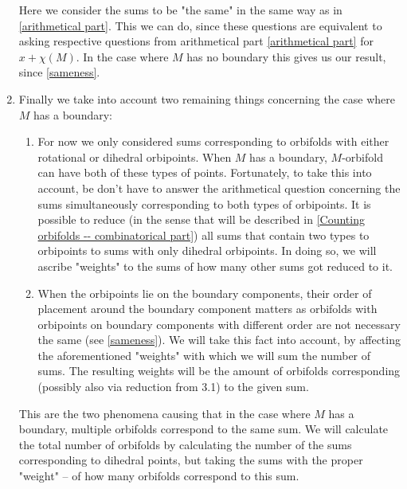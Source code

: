 \begin{enumerate}
Here we consider the sums to be "the same" in the same way as in \ref{arithmetical part}.
This we can do, since these questions are equivalent to asking respective questions 
from arithmetical 
part \ref{arithmetical part} for $x + \chi(M)$. 
In the case where $M$ has no boundary this gives us our result, since \ref{sameness}. 
\item Finally we take into account two remaining things concerning the case 
where $M$ has a boundary:
\begin{enumerate}
\item\label{additional things in boundary case -- rotational} 
For now we only considered sums corresponding to 
orbifolds with either rotational or dihedral orbipoints. 
When $M$ has a boundary, $M$-orbifold can have both of these types of points. 
Fortunately, to take this into account, be don't have to answer the 
arithmetical question concerning the sums simultaneously corresponding to both types 
of orbipoints. It is possible to reduce (in the sense that will 
be described in \ref{Counting orbifolds -- combinatorical part}) all sums 
that contain two types to orbipoints to sums with only dihedral orbipoints. 
In doing so, we will ascribe "weights" to the sums of how many other sums 
got reduced to it. 

\item When the orbipoints lie on the boundary components, their 
order of placement around the boundary component matters as orbifolds 
with orbipoints on boundary components with different order 
are not necessary the same (see \ref{sameness}). We will take this fact into account, 
by affecting the aforementioned "weights" with which we will sum the number of sums. The 
resulting weights will be the amount of orbifolds corresponding (possibly also via reduction 
from 3.1) 
to the given sum. 

\end{enumerate}
This are the two phenomena causing 
that 
in the case 
where $M$ has a boundary, multiple orbifolds correspond to the same sum. 
We will calculate the total number of orbifolds by calculating the number 
of the sums corresponding to dihedral points, but taking the sums with the proper "weight" 
-- of how many orbifolds correspond to this sum.
\end{enumerate}

